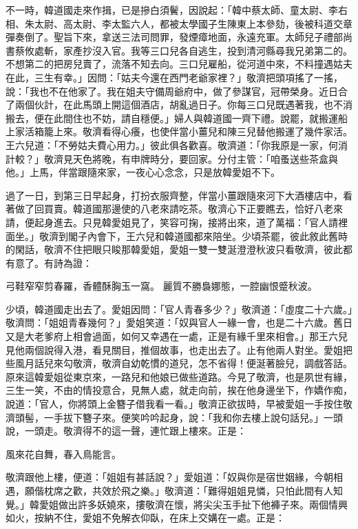 不一時，韓道國走來作揖，已是摻白須鬢，因說起：「韓中蔡太師、童太尉、李右相、朱太尉、高太尉、李太監六人，都被太學國子生陳東上本參劾，後被科道交章彈奏倒了。聖旨下來，拿送三法司問罪，發煙瘴地面，永遠充軍。太師兒子禮部尚書蔡攸處斬，家產抄沒入官。我等三口兒各自逃生，投到清河縣尋我兄弟第二的。不想第二的把房兒賣了，流落不知去向。三口兒雇船，從河道中來，不料撞遇姑夫在此，三生有幸。」因問：「姑夫今還在西門老爺家裡？」敬濟把頭項搖了一搖，說：「我也不在他家了。我在姐夫守備周爺府中，做了參謀官，冠帶榮身。近日合了兩個伙計，在此馬頭上開這個酒店，胡亂過日子。你每三口兒既遇著我，也不消搬去，便在此間住也不妨，請自穩便。」婦人與韓道國一齊下禮。說罷，就搬運船上家活箱籠上來。敬濟看得心癢，也使伴當小薑兒和陳三兒替他搬運了幾件家活。王六兒道：「不勞姑夫費心用力。」彼此俱各歡喜。敬濟道：「你我原是一家，何消計較？」敬濟見天色將晚，有申牌時分，要回家。分付主管：「咱蚤送些茶盒與他。」上馬，伴當跟隨來家，一夜心心念念，只是放韓愛姐不下。

過了一日，到第三日早起身，打扮衣服齊整，伴當小薑跟隨來河下大酒樓店中，看著做了回買賣。韓道國那邊使的八老來請吃茶。敬濟心下正要瞧去，恰好八老來請，便起身進去。只見韓愛姐見了，笑容可掬，接將出來，道了萬福：「官人請裡面坐。」敬濟到閣子內會下，王六兒和韓道國都來陪坐。少頃茶罷，彼此敘此舊時的閑話，敬濟不住把眼只睃那韓愛姐，愛姐一雙一雙涎澄澄秋波只看敬濟，彼此都有意了。有詩為證：

弓鞋窄窄剪春羅，香體酥胸玉一窩。
麗質不勝裊娜態，一腔幽恨蹙秋波。

少頃，韓道國走出去了。愛姐因問：「官人青春多少？」敬濟道：「虛度二十六歲。」敬濟問：「姐姐青春幾何？」愛姐笑道：「奴與官人一緣一會，也是二十六歲。舊日又是大老爹府上相會過面，如何又幸遇在一處，正是有緣千里來相會。」那王六兒見他兩個說得入港，看見關目，推個故事，也走出去了。止有他兩人對坐。愛姐把些風月話兒來勾敬濟，敬濟自幼乾慣的道兒，怎不省得！便涎著臉兒，調戲答話。原來這韓愛姐從東京來，一路兒和他娘已做些道路。今見了敬濟，也是夙世有緣，三生一笑，不由的情投意合，見無人處，就走向前，挨在他身邊坐下，作嬌作痴，說道：「官人，你將頭上金簪子借我看一看。」敬濟正欲拔時，早被愛姐一手按住敬濟頭髻，一手拔下簪子來。便笑吟吟起身，說：「我和你去樓上說句話兒。」一頭說，一頭走。敬濟得不的這一聲，連忙跟上樓來。正是：

風來花自舞，春入鳥能言。

敬濟跟他上樓，便道：「姐姐有甚話說？」愛姐道：「奴與你是宿世姻緣，今朝相遇，願偕枕席之歡，共效於飛之樂。」敬濟道：「難得姐姐見憐，只怕此間有人知覺。」韓愛姐做出許多妖嬈來，摟敬濟在懷，將尖尖玉手扯下他褲子來。兩個情興如火，按納不住，愛姐不免解衣仰臥，在床上交媾在一處。正是：

